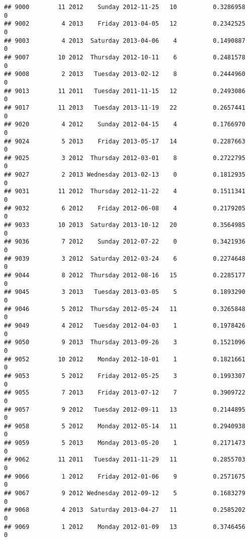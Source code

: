 \documentclass[
]{article}
\begin{document}
\begin{verbatim}
## 9000        11 2012    Sunday 2012-11-25   10          0.3286958             0
## 9002         4 2013    Friday 2013-04-05   12          0.2342525             0
## 9003         4 2013  Saturday 2013-04-06    4          0.1490887             0
## 9007        10 2012  Thursday 2012-10-11    6          0.2481578             0
## 9008         2 2013   Tuesday 2013-02-12    8          0.2444960             0
## 9013        11 2011   Tuesday 2011-11-15   12          0.2493086             0
## 9017        11 2013   Tuesday 2013-11-19   22          0.2657441             0
## 9020         4 2012    Sunday 2012-04-15    4          0.1766970             0
## 9024         5 2013    Friday 2013-05-17   14          0.2287663             0
## 9025         3 2012  Thursday 2012-03-01    8          0.2722795             0
## 9027         2 2013 Wednesday 2013-02-13    0          0.1812935             0
## 9031        11 2012  Thursday 2012-11-22    4          0.1511341             0
## 9032         6 2012    Friday 2012-06-08    4          0.2179205             0
## 9033        10 2013  Saturday 2013-10-12   20          0.3564985             0
## 9036         7 2012    Sunday 2012-07-22    0          0.3421936             0
## 9039         3 2012  Saturday 2012-03-24    6          0.2274648             0
## 9044         8 2012  Thursday 2012-08-16   15          0.2285177             0
## 9045         3 2013   Tuesday 2013-03-05    5          0.1893290             0
## 9046         5 2012  Thursday 2012-05-24   11          0.3265848             0
## 9049         4 2012   Tuesday 2012-04-03    1          0.1978426             0
## 9050         9 2013  Thursday 2013-09-26    3          0.1521096             0
## 9052        10 2012    Monday 2012-10-01    1          0.1821661             0
## 9053         5 2012    Friday 2012-05-25    3          0.1993307             0
## 9055         7 2013    Friday 2013-07-12    7          0.3909722             0
## 9057         9 2012   Tuesday 2012-09-11   13          0.2144895             0
## 9058         5 2012    Monday 2012-05-14   11          0.2940938             0
## 9059         5 2013    Monday 2013-05-20    1          0.2171473             0
## 9062        11 2011   Tuesday 2011-11-29   11          0.2855703             0
## 9066         1 2012    Friday 2012-01-06    9          0.2571675             0
## 9067         9 2012 Wednesday 2012-09-12    5          0.1683279             0
## 9068         4 2013  Saturday 2013-04-27   11          0.2585202             0
## 9069         1 2012    Monday 2012-01-09   13          0.3746456             0

\end{verbatim}
\end{document}
